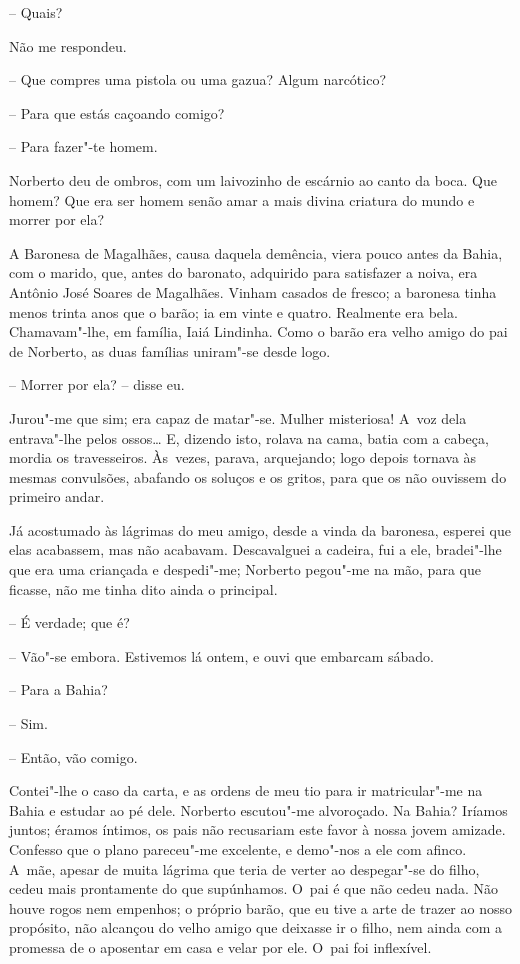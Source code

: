 -- Quais?

Não me respondeu.

-- Que compres uma pistola ou uma gazua? Algum narcótico?

-- Para que estás caçoando comigo?

-- Para fazer"-te homem.

Norberto deu de ombros, com um laivozinho de escárnio ao canto da boca.
Que homem? Que era ser homem senão amar a mais divina criatura do mundo
e morrer por ela?

A Baronesa de Magalhães, causa daquela demência, viera pouco antes da
Bahia, com o marido, que, antes do baronato, adquirido para satisfazer a
noiva, era Antônio José Soares de Magalhães. Vinham casados de fresco; a
baronesa tinha menos trinta anos que o barão; ia em vinte e quatro.
Realmente era bela. Chamavam"-lhe, em família, Iaiá Lindinha. Como o
barão era velho amigo do pai de Norberto, as duas famílias uniram"-se
desde logo.

-- Morrer por ela? -- disse eu.

Jurou"-me que sim; era capaz de matar"-se. Mulher misteriosa! A~voz dela
entrava"-lhe pelos ossos\ldots{} E, dizendo isto, rolava na cama, batia com a
cabeça, mordia os travesseiros. Às~vezes, parava, arquejando; logo
depois tornava às mesmas convulsões, abafando os soluços e os gritos,
para que os não ouvissem do primeiro andar.

Já acostumado às lágrimas do meu amigo, desde a vinda da baronesa,
esperei que elas acabassem, mas não acabavam. Descavalguei a cadeira,
fui a ele, bradei"-lhe que era uma criançada e despedi"-me; Norberto
pegou"-me na mão, para que ficasse, não me tinha dito ainda o principal.

-- É verdade; que é?

-- Vão"-se embora. Estivemos lá ontem, e ouvi que embarcam sábado.

-- Para a Bahia?

-- Sim.

-- Então, vão comigo.

Contei"-lhe o caso da carta, e as ordens de meu tio para ir matricular"-me
na Bahia e estudar ao pé dele. Norberto escutou"-me alvoroçado. Na Bahia?
Iríamos juntos; éramos íntimos, os pais não recusariam este favor à
nossa jovem amizade. Confesso que o plano pareceu"-me excelente, e
demo"-nos a ele com afinco. A~mãe, apesar de muita lágrima que teria de
verter ao despegar"-se do filho, cedeu mais prontamente do que
supúnhamos. O~pai é que não cedeu nada. Não houve rogos nem empenhos; o
próprio barão, que eu tive a arte de trazer ao nosso propósito, não
alcançou do velho amigo que deixasse ir o filho, nem ainda com a
promessa de o aposentar em casa e velar por ele. O~pai foi inflexível.

